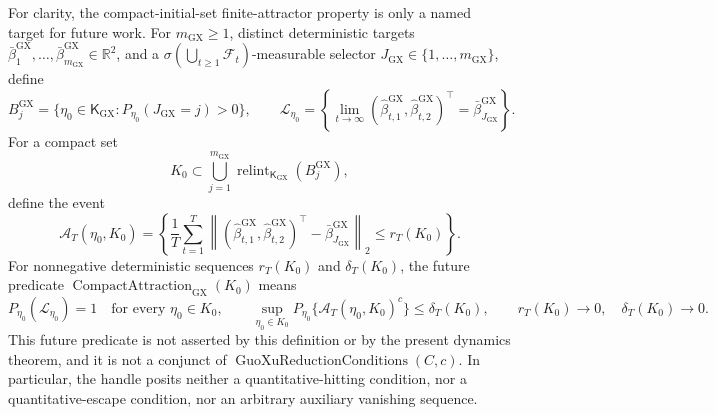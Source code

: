 For clarity, the compact-initial-set finite-attractor property is only a named target for future work. For \(m_{\mathrm{GX}}\geq1\), distinct deterministic targets \(\bar\beta^{\mathrm{GX}}_1,\ldots,\bar\beta^{\mathrm{GX}}_{m_{\mathrm{GX}}}\in\mathbb R^2\), and a \(\sigma(\bigcup_{t\geq1}\mathcal F_t)\)-measurable selector \(J_{\mathrm{GX}}\in\{1,\ldots,m_{\mathrm{GX}}\}\), define
\[
B^{\mathrm{GX}}_j=\{\eta_0\in\mathsf K_{\mathrm{GX}}:P_{\eta_0}(J_{\mathrm{GX}}=j)>0\},
\qquad
\mathcal L_{\eta_0}=\left\{\lim_{t\to\infty}
(\widehat\beta^{\mathrm{GX}}_{t,1},\widehat\beta^{\mathrm{GX}}_{t,2})^\top
=\bar\beta^{\mathrm{GX}}_{J_{\mathrm{GX}}}\right\}.
\]
For a compact set
\[
K_0\subset\bigcup_{j=1}^{m_{\mathrm{GX}}}
\operatorname{relint}_{\mathsf K_{\mathrm{GX}}}(B^{\mathrm{GX}}_j),
\]
define the event
\[
\mathcal A_T(\eta_0,K_0)=\left\{
\frac1T\sum_{t=1}^T
\left\|(\widehat\beta^{\mathrm{GX}}_{t,1},\widehat\beta^{\mathrm{GX}}_{t,2})^\top
-\bar\beta^{\mathrm{GX}}_{J_{\mathrm{GX}}}\right\|_2
\leq r_T(K_0)\right\}.
\]
For nonnegative deterministic sequences \(r_T(K_0)\) and \(\delta_T(K_0)\), the future predicate \(\operatorname{CompactAttraction}_{\mathrm{GX}}(K_0)\) means
\[
P_{\eta_0}(\mathcal L_{\eta_0})=1\quad\text{for every }\eta_0\in K_0,
\qquad
\sup_{\eta_0\in K_0}P_{\eta_0}\{\mathcal A_T(\eta_0,K_0)^c\}
\leq\delta_T(K_0),
\qquad
r_T(K_0)\to0,\quad\delta_T(K_0)\to0.
\]
This future predicate is not asserted by this definition or by the present dynamics theorem, and it is not a conjunct of \(\operatorname{GuoXuReductionConditions}(C,c)\). In particular, the handle posits neither a quantitative-hitting condition, nor a quantitative-escape condition, nor an arbitrary auxiliary vanishing sequence.
